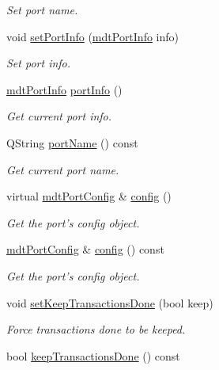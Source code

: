 \begin{DoxyCompactItemize}
\begin{DoxyCompactList}\small\item\em Set port name. \end{DoxyCompactList}\item 
void \hyperlink{classmdt_port_manager_a7e2ef93ec2731e66aa2b2d5f7ce9bc1c}{set\-Port\-Info} (\hyperlink{classmdt_port_info}{mdt\-Port\-Info} info)
\begin{DoxyCompactList}\small\item\em Set port info. \end{DoxyCompactList}\item 
\hyperlink{classmdt_port_info}{mdt\-Port\-Info} \hyperlink{classmdt_port_manager_a88109b455fc5a5f5adf0636f7450143e}{port\-Info} ()
\begin{DoxyCompactList}\small\item\em Get current port info. \end{DoxyCompactList}\item 
Q\-String \hyperlink{classmdt_port_manager_af4fcab6aaad98d74aeabfc972da1d406}{port\-Name} () const 
\begin{DoxyCompactList}\small\item\em Get current port name. \end{DoxyCompactList}\item 
virtual \hyperlink{classmdt_port_config}{mdt\-Port\-Config} \& \hyperlink{classmdt_port_manager_a9cf3ea2da38f81682695b37448712ffd}{config} ()
\begin{DoxyCompactList}\small\item\em Get the port's config object. \end{DoxyCompactList}\item 
\hyperlink{classmdt_port_config}{mdt\-Port\-Config} \& \hyperlink{classmdt_port_manager_a735b7dc766fc2f45fb2cf9772c4201b0}{config} () const 
\begin{DoxyCompactList}\small\item\em Get the port's config object. \end{DoxyCompactList}\item 
void \hyperlink{classmdt_port_manager_a9adb5098766c9df588bc9978b00c5eb2}{set\-Keep\-Transactions\-Done} (bool keep)
\begin{DoxyCompactList}\small\item\em Force transactions done to be keeped. \end{DoxyCompactList}\item 
bool \hyperlink{classmdt_port_manager_a798ce0939234870ae3b9995108e54380}{keep\-Transactions\-Done} () const 

\end{DoxyCompactItemize}
